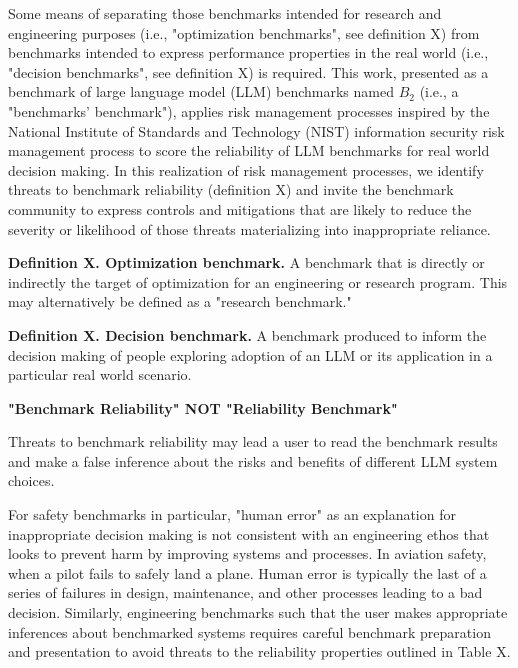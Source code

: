 \documentclass{article}
\begin{document}
Some means of separating those benchmarks intended for research and engineering purposes (i.e., "optimization benchmarks", see definition X) from benchmarks intended to express performance properties in the real world (i.e., "decision benchmarks", see definition X) is required. This work, presented as a benchmark of large language model (LLM) benchmarks named \(B_2\) (i.e., a "benchmarks' benchmark"), applies risk management processes inspired by the National Institute of Standards and Technology (NIST) information security risk management process to score the reliability of LLM benchmarks for real world decision making. In this realization of risk management processes, we identify threats to benchmark reliability (definition X) and invite the benchmark community to express controls and mitigations that are likely to reduce the severity or likelihood of those threats materializing into inappropriate reliance.

{\bf Definition X. Optimization benchmark.} A benchmark that is directly or indirectly the target of optimization for an engineering or research program. This may alternatively be defined as a "research benchmark."

{\bf Definition X. Decision benchmark.} A benchmark produced to inform the decision making of people exploring adoption of an LLM or its application in a particular real world scenario.

\begin{center}
    \begin{tcolorbox}[colback=blue!10, colframe=blue!50, width=\textwidth, boxrule=0.5mm, sharp corners, coltext=black, halign=center]
        \bf "Benchmark Reliability" NOT "Reliability Benchmark"
    \end{tcolorbox}
\end{center}

Threats to benchmark reliability may lead a user to read the benchmark results and make a false inference about the risks and benefits of different LLM system choices.

For safety benchmarks in particular, "human error" as an explanation for inappropriate decision making is not consistent with an engineering ethos that looks to prevent harm by improving systems and processes. In aviation safety, when a pilot fails to safely land a plane. Human error is typically the last of a series of failures in design, maintenance, and other processes leading to a bad decision. Similarly, engineering benchmarks such that the user makes appropriate inferences about benchmarked systems requires careful benchmark preparation and presentation to avoid threats to the reliability properties outlined in Table X.
\end{document}

